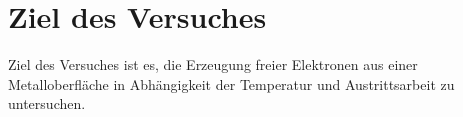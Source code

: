 \section{Ziel des Versuches}
\label{sec:versuchsziel}

Ziel des Versuches ist es, die Erzeugung freier Elektronen
aus einer Metalloberfläche in Abhängigkeit der Temperatur 
und Austrittsarbeit zu untersuchen.
